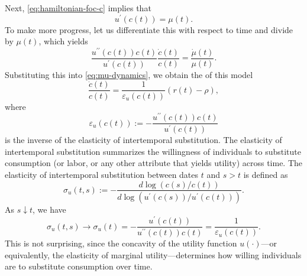 \documentclass[\topdir/lecture\_notes.tex]{subfiles}
\begin{document}
Next, \eqref{eq:hamiltonian-foc-c} implies that
\begin{equation*}
  u^{\prime}(c(t))=\mu(t).
\end{equation*}
To make more progress, let us differentiate this with respect to time and divide by \(\mu(t)\), which yields
\[
  \frac{u^{\prime \prime}(c(t)) c(t)}{u^{\prime}(c(t))} \frac{\dot{c}(t)}{c(t)}=\frac{\dot{\mu}(t)}{\mu(t)}.
\]
Substituting this into \eqref{eq:mu-dynamics}, we obtain the  of this model
\begin{equation}
  \frac{\dot{c}(t)}{c(t)}=\frac{1}{\varepsilon_{u}(c(t))}(r(t)-\rho),
  \label{eq:euler-consumption}
\end{equation}
where
\begin{equation*}
  \varepsilon_{u}(c(t)) :=-\frac{u^{\prime \prime}(c(t)) c(t)}{u^{\prime}(c(t))}
\end{equation*}
is the inverse of the elasticity of intertemporal substitution.
The elasticity of intertemporal substitution summarizes the willingness of individuals to substitute consumption (or labor, or any other attribute that yields utility) across time.
The elasticity of intertemporal substitution between dates \(t\) and \(s>t\) is defined as
\[
  \sigma_{u}(t, s):=-\frac{d \log (c(s) / c(t))}{d \log \left(u^{\prime}(c(s)) / u^{\prime}(c(t))\right)}.
\]
As \(s \downarrow t\), we have
\begin{equation*}
  \sigma_{u}(t, s) \rightarrow \sigma_{u}(t)=-\frac{u^{\prime}(c(t))}{u^{\prime \prime}(c(t)) c(t)}=\frac{1}{\varepsilon_{u}(c(t))}.
\end{equation*}
This is not surprising, since the concavity of the utility function \(u(\cdot)\)---or equivalently, the elasticity of marginal utility---determines how willing individuals are to substitute consumption over time.
\end{document}
